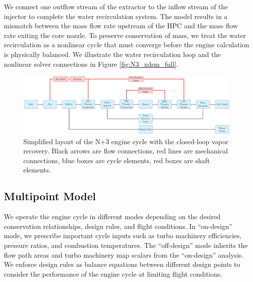 \documentclass[conf]{new-aiaa}
\begin{document}
We connect one outflow stream of the extractor to the inflow stream of the injector to complete the water recirculation system.
The model results in a mismatch between the mass flow rate upstream of the HPC and the mass flow rate exiting the core nozzle.
To preserve conservation of mass, we treat the water recirculation as a nonlinear cycle that must converge before the engine calculation is physically balanced.
We illustrate the water recirculation loop and the nonlinear solver connections in Figure \ref{fig:N3_xdsm_full}.

\begin{figure}[hbt!]
    \centering
    \includegraphics[width=1.0\textwidth]{N3_CLVR_cycle.pdf}
    \caption{
        Simplified layout of the N+3 engine cycle with the closed-loop vapor recovery.
        Black arrows are flow connections, red lines are mechanical connections, blue boxes are cycle elements, red boxes are shaft elements.
    }
    \label{fig:n3_clvr}
\end{figure}

\subsection{Multipoint Model}
We operate the engine cycle in different modes depending on the desired conservation relationships, design rules, and flight conditions.
In ``on-design'' mode, we prescribe important cycle inputs such as turbo machinery efficiencies, pressure ratios, and combustion temperatures.
The ``off-design'' mode inherits the flow path areas and turbo machinery map scalars from the ``on-design'' analysis.
We enforce design rules as balance equations between different design points to consider the performance of the engine cycle at limiting flight conditions.
\end{document}
